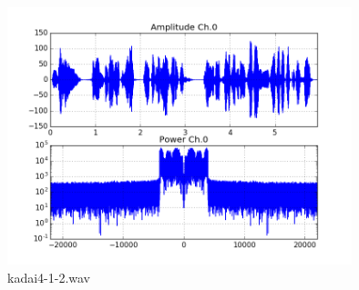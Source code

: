 \begin{figure}[h]
  \begin{center}
    \includegraphics[width=10cm]{./img/kadai4-1-2.png}
    \caption{kadai4-1-2.wav}
  \end{center}
\end{figure}

